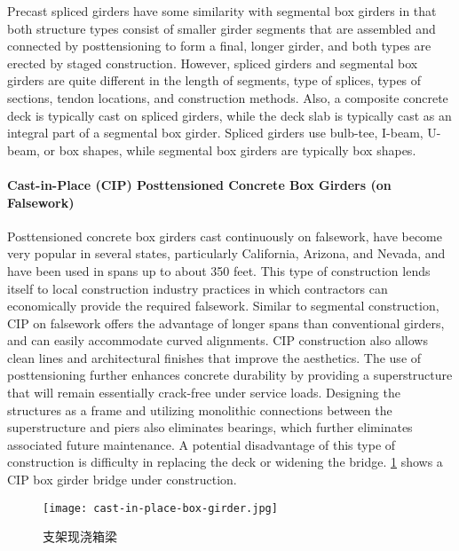 Precast spliced girders have some similarity with segmental box girders in that both structure types consist of
smaller girder segments that are assembled and connected by posttensioning to form a final, longer girder, and both
types are erected by staged construction. However, spliced girders and segmental box girders are quite different in
the length of segments, type of splices, types of sections, tendon locations, and construction methods. Also, a
composite concrete deck is typically cast on spliced girders, while the deck slab is typically cast as an integral part of
a segmental box girder. Spliced girders use bulb-tee, I-beam, U-beam, or box shapes, while segmental box girders are
typically box shapes.



\paragraph{Cast-in-Place (CIP) Posttensioned Concrete Box Girders (on Falsework)}

Posttensioned concrete box girders cast continuously on falsework, have become very popular in several states,
particularly California, Arizona, and Nevada, and have been used in spans up to about 350 feet. This type of
construction lends itself to local construction industry practices in which contractors can economically provide the
required falsework. Similar to segmental construction, CIP on falsework offers the advantage of longer spans than
conventional girders, and can easily accommodate curved alignments. CIP construction also allows clean lines and
architectural finishes that improve the aesthetics. The use of posttensioning further enhances concrete durability by
providing a superstructure that will remain essentially crack-free under service loads. Designing the structures as a
frame and utilizing monolithic connections between the superstructure and piers also eliminates bearings, which
further eliminates associated future maintenance. A potential disadvantage of this type of construction is difficulty in
replacing the deck or widening the bridge. \cref{fig:cast-in-place-box-girder} shows a CIP box girder bridge under construction.

\begin{figure}
  \texttt{[image: cast-in-place-box-girder.jpg]}
  \caption{支架现浇箱梁}
  \label{fig:cast-in-place-box-girder}
\end{figure}

